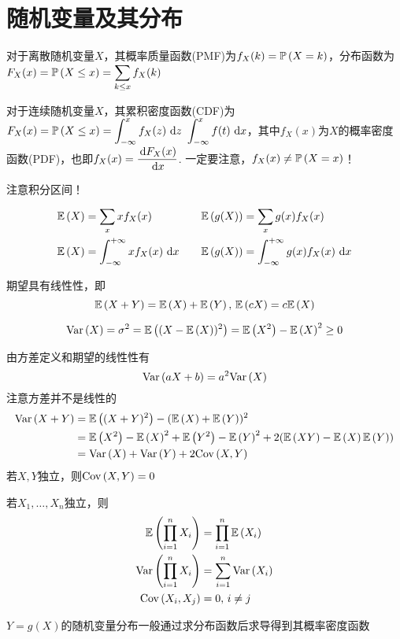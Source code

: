 
\section{随机变量及其分布}
\begin{definition}
对于离散随机变量$X$，其概率质量函数(PMF)为$f_X(k)=\pr{X=k}$，分布函数为$\disp F_X(x)=\pr{X\leq x}=\sum_{k\leq x}f_X(k)$
\end{definition}
\begin{definition}
对于连续随机变量$X$，其累积密度函数(CDF)为$F_X(x)=\pr{X\leq x}=\intabu{-\infty}{x}{f_X(z)}{z}$
$\displaystyle \intab{-\infty}{x}{f(t)}$，其中$f_X(x)$为$X$的概率密度函数(PDF)，也即$f_X(x)=\dfrac{\diff F_X(x)}{\diff x}$.
一定要注意，$f_X(x)\ne\pr{X=x}$！
\end{definition}
注意积分区间！
\begin{definition}[期望]
\[\begin{aligned}
\E{X}&=\sum_x xf_X(x) \quad& \E{g(X)}&=\sum_x g(x)f_X(x)\\
\E{X}&=\intab{-\infty}{+\infty}{xf_X(x)} \quad& \E{g(X)}&=\intab{-\infty}{+\infty}{g(x)f_X(x)}
\end{aligned}\]
\end{definition}
\par 期望具有线性性，即
\[\E{X+Y}=\E{X}+\E{Y},\,\E{cX}=c\E{X}\]
\begin{definition}[方差]
\[\Var{X}=\sigma^2=\E{(X-\E{X})^2}=\E{X^2}-\E{X}^2\geq 0\]
\end{definition}
由方差定义和期望的线性性有
\[\Var{aX+b}=a^2\Var{X}\]
注意方差并不是线性的
\[\begin{aligned}
\Var{X+Y}&=\E{(X+Y)^2}-(\E{X}+\E{Y})^2\\
&=\E{X^2}-\E{X}^2+\E{Y^2}-\E{Y}^2+2(\E{XY}-\E{X}\E{Y})\\
&=\Var{X}+\Var{Y}+2\Cov{X,Y}
\end{aligned}\]
若$X,Y$独立，则$\Cov{X,Y}=0$
\begin{theorem}
若$X_1,\ldots,X_n$独立，则
\[\begin{aligned}
\E{\prod_{i=1}^nX_i}&=\prod_{i=1}^n\E{X_i}\\
\Var{\prod_{i=1}^nX_i}&=\sum_{i=1}^n\Var{X_i}\\
\Cov{X_i,X_j}&=0,\,i\ne j
\end{aligned}\]
\end{theorem}
$Y=g(X)$的随机变量分布一般通过求分布函数后求导得到其概率密度函数

